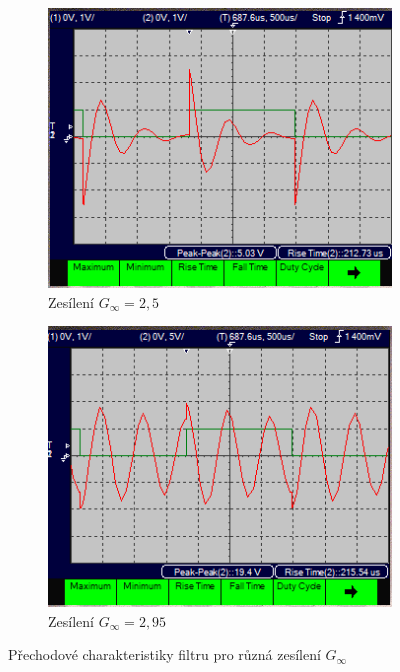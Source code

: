 \documentclass[twoside]{article}
\begin{document}
\begin{figure}[h!]
    \begin{subfigure}{0.48\textwidth}
        \centering
        \includegraphics[width=1\linewidth]{step_15k.png}
        \caption{Zesílení $G_{\infty} = 2,5$}
        \label{fig:step_15k}
    \end{subfigure}
    \begin{subfigure}{0.48\textwidth}
        \centering
        \includegraphics[width=1\linewidth]{step_19k5.png}
        \caption{Zesílení $G_{\infty} = 2,95$}
        \label{fig:step_19k}
    \end{subfigure}

    \caption{Přechodové charakteristiky filtru pro různá zesílení $G_{\infty}$}
    \label{fig:step}
\end{figure}
\end{document}
